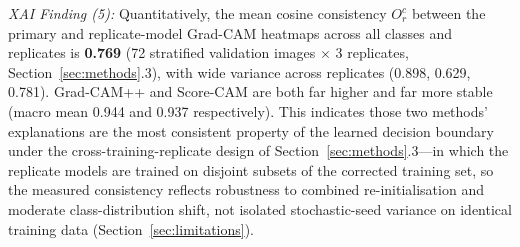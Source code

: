 \textit{XAI Finding (5):} Quantitatively, the mean cosine consistency $O_r^c$ between the primary and replicate-model Grad-CAM heatmaps across all classes and replicates is \textbf{0.769} (72 stratified validation images $\times$ 3 replicates, Section~\ref{sec:methods}.3), with wide variance across replicates (0.898, 0.629, 0.781). Grad-CAM++ and Score-CAM are both far higher and far more stable (macro mean 0.944 and 0.937 respectively). This indicates those two methods' explanations are the most consistent property of the learned decision boundary under the cross-training-replicate design of Section~\ref{sec:methods}.3---in which the replicate models are trained on disjoint subsets of the corrected training set, so the measured consistency reflects robustness to combined re-initialisation and moderate class-distribution shift, not isolated stochastic-seed variance on identical training data (Section~\ref{sec:limitations}).

